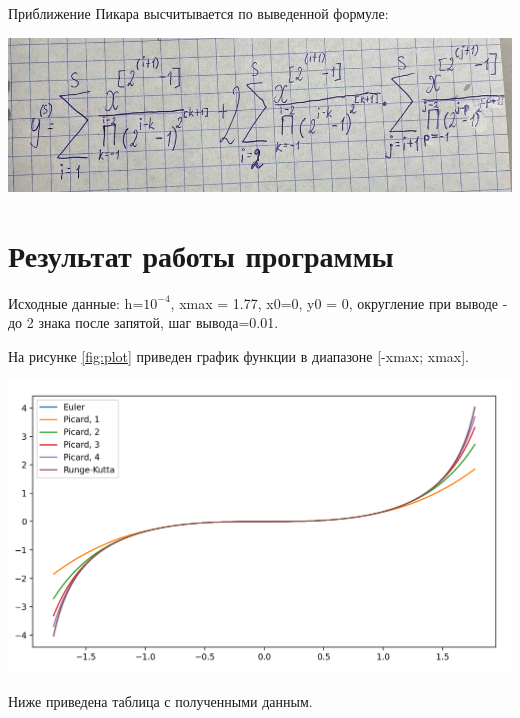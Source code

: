\documentclass[12pt]{report}
\begin{document}
Приближение Пикара высчитывается по выведенной формуле:

\includegraphics[scale=1]{img/formula}\label{fig:formula}

\chapter{Результат работы программы}

Исходные данные: h=$10^{-4}$, xmax = 1.77, x0=0, y0 = 0, округление при выводе - до 2 знака после запятой, шаг вывода=0.01.


На рисунке \ref{fig:plot} приведен график функции в диапазоне [-xmax; xmax].

\includegraphics[scale=0.6]{img/plot}\label{fig:plot}

Ниже приведена таблица с полученными данным.
\end{document}
